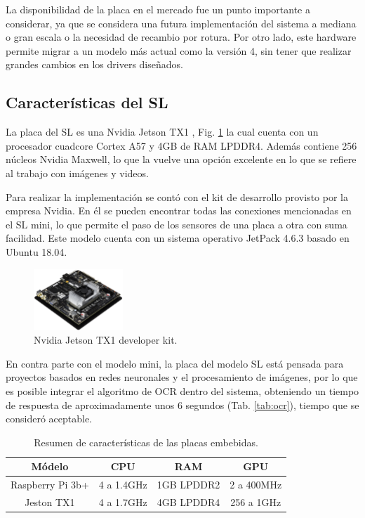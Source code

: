 La disponibilidad de la placa en el mercado fue un punto importante a considerar, ya que se considera una futura implementación del sistema a mediana o gran escala o la necesidad de recambio por rotura. Por otro lado, este hardware permite migrar a un modelo más actual como la versión 4, sin tener que realizar grandes cambios en los drivers diseñados.


\subsection{Características del SL}

La placa del SL es una Nvidia Jetson TX1 \cite{nvidia_manual_nodate}, Fig. \ref{fig:JTX1} la cual cuenta con un procesador cuadcore Cortex A57 y 4GB de RAM LPDDR4. Además contiene  256 núcleos Nvidia Maxwell, lo que la vuelve una opción excelente en lo que se refiere al trabajo con imágenes y videos.

Para realizar la implementación se contó con el kit de desarrollo provisto por la empresa Nvidia. En él se pueden encontrar todas las conexiones mencionadas en el SL mini, lo que permite el paso de los sensores de una placa a otra con suma facilidad.
Este modelo cuenta con un sistema operativo JetPack 4.6.3 basado en Ubuntu 18.04.

\begin{figure}[bth]
    \centering
    \includegraphics[width=0.3\textwidth]{imgs/JTX1-developerkit.png}
    \caption{Nvidia Jetson TX1 developer kit.}
    \label{fig:JTX1}
\end{figure}


En contra parte con el modelo mini, la placa del modelo SL está pensada para proyectos basados en redes neuronales y el procesamiento de imágenes, por lo que es posible integrar el algoritmo de OCR dentro del sistema, obteniendo un tiempo de respuesta de aproximadamente unos 6 segundos (Tab. \ref{tab:ocr}), tiempo que se consideró aceptable.


\begin{table}[bth]
    \centering
    \begin{tabular}{cccc}
        \toprule
        Módelo           & CPU & RAM        & GPU        \\
        \midrule
        Raspberry Pi 3b+ & 4  a 1.4GHz          & 1GB LPDDR2 & 2 a 400MHz \\
        Jeston TX1       & 4  a 1.7GHz          & 4GB LPDDR4 & 256 a 1GHz \\
        \bottomrule
    \end{tabular}
    \caption{Resumen de características de las placas embebidas.}
\end{table}

